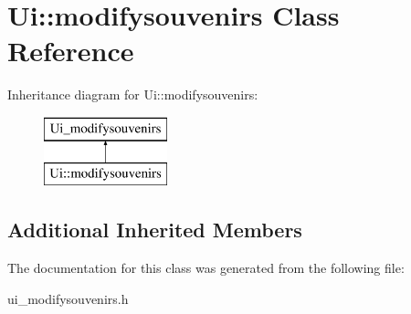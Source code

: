 \hypertarget{class_ui_1_1modifysouvenirs}{}\section{Ui\+:\+:modifysouvenirs Class Reference}
\label{class_ui_1_1modifysouvenirs}
Inheritance diagram for Ui\+:\+:modifysouvenirs\+:\begin{figure}[H]
\begin{center}
\leavevmode
\includegraphics[height=2.000000cm]{class_ui_1_1modifysouvenirs}
\end{center}
\end{figure}
\subsection*{Additional Inherited Members}


The documentation for this class was generated from the following file\+:\begin{DoxyCompactItemize}
\item 
ui\+\_\+modifysouvenirs.\+h\end{DoxyCompactItemize}
